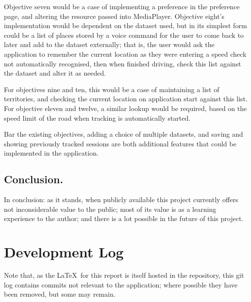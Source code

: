 \documentclass[11pt, a4paper, notitlepage]{report}
\begin{document}
Objective seven would be a case of implementing a preference in the preference page, and altering the resource passed into MediaPlayer. Objective eight's implementation would be dependent on the dataset used, but in its simplest form could be a list of places stored by a voice command for the user to come back to later and add to the dataset externally; that is, the user would ask the application to remember the current location as they were entering a speed check not automatically recognised, then when finished driving, check this list against the dataset and alter it as needed.

For objectives nine and ten, this would be a case of maintaining a list of territories, and checking the current location on application start against this list. For objective eleven and twelve, a similar lookup would be required, based on the speed limit of the road when tracking is automatically started.

Bar the existing objectives, adding a choice of multiple datasets, and saving and showing previously tracked sessions are both additional features that could be implemented in the application.

\section{Conclusion.}
In conclusion: as it stands, when publicly available this project currently offers not inconsiderable value to the public; most of its value is as a learning experience to the author; and there is a lot possible in the future of this project.

\appendix
\chapter{Development Log}\label{app:GitLog}
Note that, as the \LaTeX\ for this report is itself hosted in the repository, this git log contains commits not relevant to the application; where possible they have been removed, but some may remain. 
\end{document}
